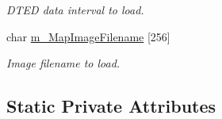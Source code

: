 \begin{DoxyCompactItemize}
\begin{DoxyCompactList}\small\item\em DTED data interval to load. \end{DoxyCompactList}\item 
\hypertarget{class_viewer3_d_ac65db97905b3ff4bc0d82f18b2946bee}{
char \hyperlink{class_viewer3_d_ac65db97905b3ff4bc0d82f18b2946bee}{m\_\-MapImageFilename} \mbox{[}256\mbox{]}}
\label{class_viewer3_d_ac65db97905b3ff4bc0d82f18b2946bee}

\begin{DoxyCompactList}\small\item\em Image filename to load. \end{DoxyCompactList}\end{DoxyCompactItemize}
\subsection*{Static Private Attributes}

